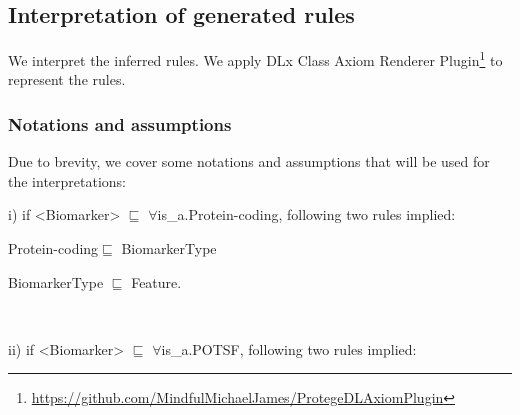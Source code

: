 \subsection{Interpretation of generated rules}
We interpret the inferred rules. We apply DLx Class Axiom Renderer Plugin\footnote{\url{https://github.com/MindfulMichaelJames/ProtegeDLAxiomPlugin}} to represent the rules.   
\subsubsection{Notations and assumptions}
Due to brevity, we cover some notations and assumptions that will be used for the interpretations:

\noindent i) if <Biomarker> $\sqsubseteq$ $\forall$is\_a.Protein-coding, following two rules implied:\\

\vspace{-6mm}
\begin{itemize}[noitemsep]
\scriptsize{
    \item Protein-coding$\sqsubseteq$ BiomarkerType
    \item BiomarkerType $\sqsubseteq$ Feature.}\\
\end{itemize}
\vspace{-6mm}

\noindent ii) if <Biomarker> $\sqsubseteq$ $\forall$is\_a.POTSF, following two rules implied:\\

